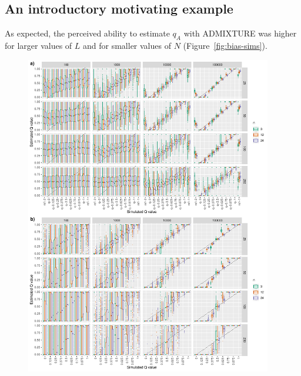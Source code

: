 {\subsection*{An introductory motivating example}

As expected, the perceived ability to estimate $q_A$ with ADMIXTURE was higher
for larger values of $L$ and for smaller values of $N$ (Figure~\ref{fig:bias-sims}).
\begin{figure}
\newcommand{\biassimscap}{\footnotesize ADMIXTURE estimates of $q_A$ as described in
{\em An introductory motivating example}. In these results, the apparent ability to estimate $q_A$
is a bias resulting from the use of sampling with replacement to simulate new, admixed genotypes to
test in ADMIXTURE.  In each figure, the different columns represent different numbers of markers
from 10 to 100,000, while different rows represent different original sample sizes, $N$, taken. Colors
of the boxplots indicate how many new individuals, $n$, of each $q_A$ value were simulated during each
replicate.}
\includegraphics[width=0.96\textwidth]{figures/bias-sims-unsup-and-sup.pdf}

\end{figure}}
